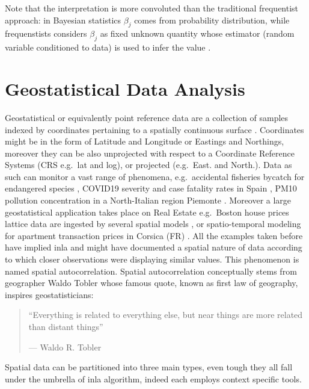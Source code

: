 \documentclass[
  12pt,
  a4paper,
  oneside]{book}
\theoremstyle{definition}
\theoremstyle{definition}
\theoremstyle{definition}
\theoremstyle{remark}
\begin{document}
Note that the interpretation is more convoluted \citeyearpar{wang2018bayesian} than the traditional frequentist approach: in Bayesian statistics \(\beta_{j}\) comes from probability distribution, while frequenstists considers \(\beta_{j}\) as fixed unknown quantity whose estimator (random variable conditioned to data) is used to infer the value \citeyearpar{Blangiardo-Cameletti}.

\hypertarget{prdm}{%
\chapter{Geostatistical Data Analysis}\label{prdm}}

Geostatistical or equivalently point reference data are a collection of samples indexed by coordinates pertaining to a spatially continuous surface \citep{Moraga2019}. Coordinates might be in the form of Latitude and Longitude or Eastings and Northings, moreover they can be also unprojected with respect to a Coordinate Reference Systems (CRS e.g.~lat and log), or projected (e.g.~East. and North.). Data as such can monitor a vast range of phenomena, e.g.~accidental fisheries bycatch for endangered species \citep{CosandeyGodin2015}, COVID19 severity and case fatality rates in Spain \citep{Moragacovid2020}, PM10 pollution concentration in a North-Italian region Piemonte \citep{Cameletti2012}. Moreover a large geostatistical application takes place on Real Estate e.g.~Boston house prices lattice data \citep{mass} are ingested by several spatial models \citep{rubiorealestate}, or spatio-temporal modeling for apartment transaction prices in Corsica (FR) \citep{Ling}. All the examples taken before have implied inla and might have documented a spatial nature of data according to which closer observations were displaying similar values. This phenomenon is named spatial autocorrelation. Spatial autocorrelation conceptually stems from geographer Waldo Tobler whose famous quote, known as first law of geography, inspires geostatisticians:

\begin{quote}
``Everything is related to everything else,
but near things are more related than distant things''

\hfill --- Waldo R. Tobler
\end{quote}

Spatial data can be partitioned into three main types, even tough they all fall under the umbrella of inla algorithm, indeed each employs context specific tools.
\end{document}
